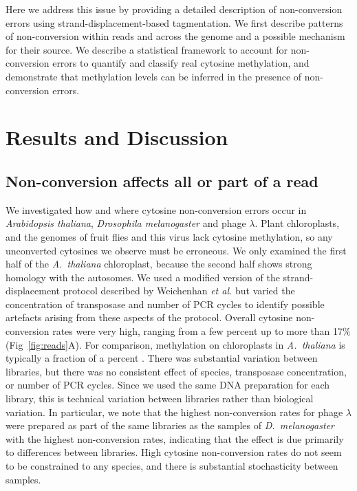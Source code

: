 \documentclass[10pt,draft,letterpaper]{article}
\begin{document}
Here we address this issue by providing a detailed description of non-conversion errors using strand-displacement-based tagmentation.
We first describe patterns of non-conversion within reads and across the genome and a possible mechanism for their source.
We describe a statistical framework to account for non-conversion errors to quantify and classify real cytosine methylation, and demonstrate that methylation levels can be inferred in the presence of non-conversion errors.

\section*{Results and Discussion}

\subsection*{Non-conversion affects all or part of a read}

We investigated how and where cytosine non-conversion errors occur in \textit{Arabidopsis thaliana}, \textit{Drosophila melanogaster} and phage $\lambda$.
Plant chloroplasts, and the genomes of fruit flies and this virus lack cytosine methylation, so any unconverted cytosines we observe must be erroneous.
We only examined the first half of the \textit{A.~thaliana} chloroplast, because the second half shows strong homology with the autosomes.
We used a modified version of the strand-displacement protocol described by Weichenhan \textit{et al.} \cite{weichenhan2019generation} but varied the concentration of transposase and number of PCR cycles to identify possible artefacts arising from these aspects of the protocol.
Overall cytosine non-conversion rates were very high, ranging from a few percent up to more than 17\% (Fig~\ref{fig:reads}A).
For comparison, methylation on chloroplasts in \textit{A.~thaliana} is typically a fraction of a percent \cite{zhang2018large}.
There was substantial variation between libraries, but there was no consistent effect of species, transposase concentration, or number of PCR cycles.
Since we used the same DNA preparation for each library, this is technical variation between libraries rather than biological variation.
In particular, we note that the highest non-conversion rates for phage $\lambda$ were prepared as part of the same libraries as the samples of \textit{D.~melanogaster} with the highest non-conversion rates, indicating that the effect is due primarily to differences between libraries.
High cytosine non-conversion rates do not seem to be constrained to any species, and there is substantial stochasticity between samples.
\end{document}

